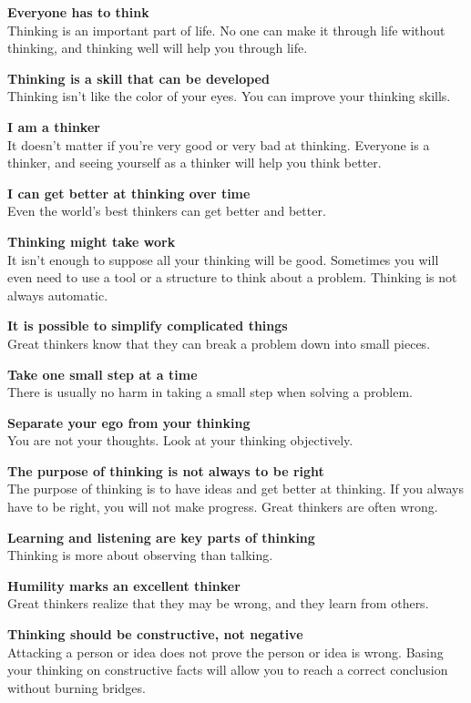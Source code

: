 \textbf{Everyone has to think} \\
Thinking is an important part of life. No one can make it through life without thinking, and thinking well will help you through life.

\textbf{Thinking is a skill that can be developed} \\
Thinking isn't like the color of your eyes. You can improve your thinking skills.

\textbf{I am a thinker} \\
It doesn't matter if you're very good or very bad at thinking. Everyone is a thinker, and seeing yourself as a thinker will help you think better.

\textbf{I can get better at thinking over time} \\
Even the world's best thinkers can get better and better.

\textbf{Thinking might take work} \\
It isn't enough to suppose all your thinking will be good. Sometimes you will even need to use a tool or a structure to think about a problem. Thinking is not always automatic.

\textbf{It is possible to simplify complicated things} \\
Great thinkers know that they can break a problem down into small pieces.

\textbf{Take one small step at a time} \\
There is usually no harm in taking a small step when solving a problem.

\textbf{Separate your ego from your thinking} \\
You are not your thoughts. Look at your thinking objectively.

\textbf{The purpose of thinking is not always to be right} \\
The purpose of thinking is to have ideas and get better at thinking. If you always have to be right, you will not make progress. Great thinkers are often wrong.

\textbf{Learning and listening are key parts of thinking} \\
Thinking is more about observing than talking.

\textbf{Humility marks an excellent thinker} \\
Great thinkers realize that they may be wrong, and they learn from others.

\textbf{Thinking should be constructive, not negative} \\
Attacking a person or idea does not prove the person or idea is wrong. Basing your thinking on constructive facts will allow you to reach a correct conclusion without burning bridges.

